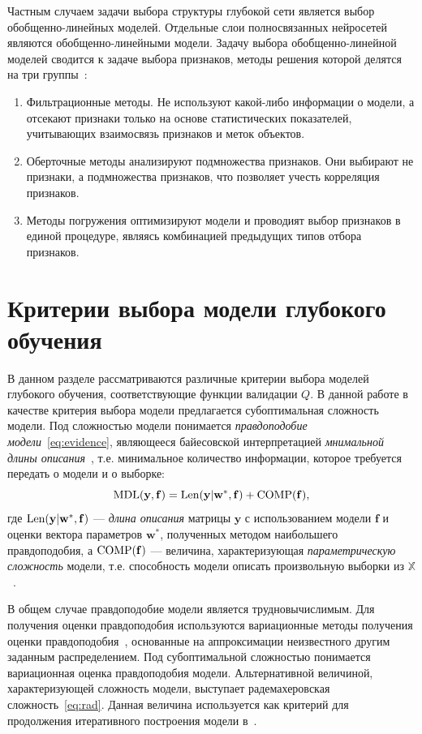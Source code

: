 Частным случаем задачи выбора структуры глубокой сети является выбор обобщенно-линейных моделей. Отдельные слои полносвязанных нейросетей являются обобщенно-линейными модели. Задачу выбора обобщенно-линейной моделей сводится к задаче выбора признаков, методы решения которой делятся на три группы~\cite{feature_select}:
\begin{enumerate}
\item Фильтрационные методы. Не используют какой-либо информации о модели, а отсекают признаки только на основе статистических показателей, учитывающих взаимосвязь признаков и меток объектов.
\item Оберточные методы  анализируют подмножества признаков. Они выбирают не признаки, а подмножества признаков, что позволяет учесть корреляция признаков.
\item Методы погружения оптимизируют модели и проводият выбор признаков в единой процедуре, являясь комбинацией предыдущих типов отбора признаков.
\end{enumerate} 

\section{Критерии выбора модели глубокого обучения}
В данном разделе рассматриваются различные критерии выбора моделей глубокого обучения, соответствующие функции валидации $Q$.
В данной работе в качестве критерия выбора модели предлагается субоптимальная сложность модели. Под сложностью модели понимается \emph{правдоподобие модели}~\eqref{eq:evidence}, являющееся байесовской интерпретацией \emph{мнимальной длины описания}~\cite{mdl}, т.е. минимальное количество информации, которое требуется передать о модели и о выборке:
\begin{equation}
\label{eq:mdl}
	\textnormal{MDL}(\mathbf{y},\mathbf{f}) = \textnormal{Len}(\mathbf{y}|\mathbf{w}^{*}, \mathbf{f}) + \textnormal{COMP}(\mathbf{f}),
\end{equation}
где  $\textnormal{Len}(\mathbf{y}|\mathbf{w}^{*}, \mathbf{f})$ --- \emph{длина описания} матрицы $\mathbf{y}$ с использованием модели $\mathbf{f}$ и оценки вектора параметров $\mathbf{w}^{*}$, полученных методом наибольшего правдоподобия, а $\textnormal{COMP}(\mathbf{f})$ --- величина, характеризующая \emph{параметрическую сложность} модели, т.е. способность модели описать произвольную выборки из $\mathbb{X}$~\cite{mdl}.

{В общем случае правдоподобие модели является трудновычислимым.} Для получения оценки правдоподобия используются вариационные методы получения оценки правдоподобия~\cite{Bishop}, основанные на аппроксимации неизвестного другим заданным распределением. Под субоптимальной сложностью понимается вариационная оценка правдоподобия модели.
Альтернативной величиной, характеризующей сложность модели, выступает радемахеровская сложность~\eqref{eq:rad}. Данная величина используется как критерий для продолжения итеративного построения модели в~\cite{adanet}.

